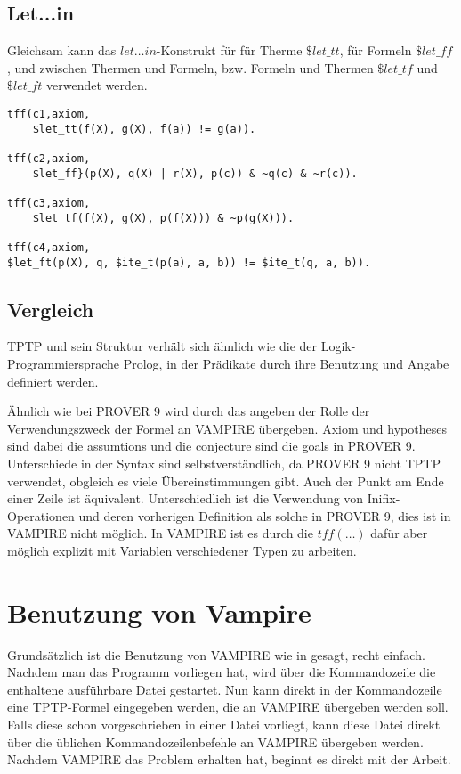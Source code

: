 \documentclass{article}
\begin{document}
\subsection{Let...in}
\label{subsec:tptpletin}

Gleichsam kann das $let\dots in$-Konstrukt für für Therme $\$let\_tt$, für Formeln $\$let\_ff$, und zwischen Thermen und Formeln, bzw. Formeln und Thermen $\$let\_tf$ und $\$let\_ft$ verwendet werden.
\begin{lstlisting}[language=tptp]
tff(c1,axiom,
	$let_tt(f(X), g(X), f(a)) != g(a)).

tff(c2,axiom,
	$let_ff}(p(X), q(X) | r(X), p(c)) & ~q(c) & ~r(c)).

tff(c3,axiom,
	$let_tf(f(X), g(X), p(f(X))) & ~p(g(X))).

tff(c4,axiom,
$let_ft(p(X), q, $ite_t(p(a), a, b)) != $ite_t(q, a, b)).
\end{lstlisting}
\subsection{Vergleich}
\label{subsec:tptpcomp}
TPTP und sein Struktur verhält sich ähnlich wie die der Logik-Programmiersprache Prolog, in der Prädikate durch ihre Benutzung und Angabe definiert werden.

Ähnlich wie bei PROVER 9 wird durch das angeben der Rolle der Verwendungszweck der Formel an VAMPIRE übergeben. Axiom und hypotheses sind dabei die assumtions und die conjecture sind die goals in PROVER 9.
Unterschiede in der Syntax sind selbstverständlich, da PROVER 9 nicht TPTP verwendet, obgleich es viele Übereinstimmungen gibt.
Auch der Punkt am Ende einer Zeile ist äquivalent. Unterschiedlich ist die Verwendung von Inifix-Operationen und deren vorherigen Definition als solche in PROVER 9, 
dies ist in VAMPIRE nicht möglich. In VAMPIRE ist es durch die $tff(\dots)$ dafür aber möglich explizit mit Variablen verschiedener Typen zu arbeiten.\cite{cav2013, prover9manual} 


\section{Benutzung von Vampire}
\label{sec:invocation}

Grundsätzlich ist die Benutzung von VAMPIRE wie in \cite{cav2013} gesagt, recht einfach. Nachdem man das Programm vorliegen hat, wird über die Kommandozeile die enthaltene ausführbare Datei gestartet. Nun kann direkt in der Kommandozeile eine TPTP-Formel eingegeben werden, die an VAMPIRE übergeben werden soll. Falls diese schon vorgeschrieben in einer Datei vorliegt, kann diese Datei direkt über die üblichen Kommandozeilenbefehle an VAMPIRE übergeben werden. Nachdem VAMPIRE das Problem erhalten hat, beginnt es direkt mit der Arbeit.
\end{document}
